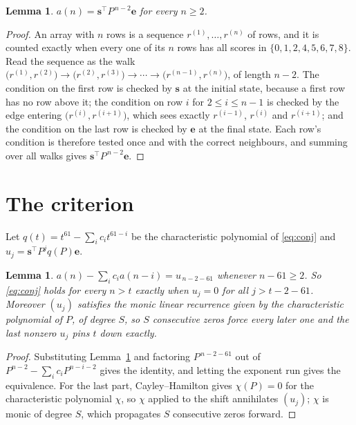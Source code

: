 \documentclass[11pt,a4paper]{article}
\theoremstyle{plain}
\newtheorem{lemma}[theorem]{Lemma}
\theoremstyle{definition}
\begin{document}
\begin{lemma}\label{lem:walk}
$a(n)=\mathbf{s}^{\!\top}P^{\,n-2}\mathbf{e}$ for every $n\ge2$.
\end{lemma}

\begin{proof}
An array with $n$ rows is a sequence $r^{(1)},\dots,r^{(n)}$ of rows, and it is counted
exactly when every one of its $n$ rows has all scores in $\{0,1,2,4,5,6,7,8\}$. Read the sequence as the
walk $\bigl(r^{(1)},r^{(2)}\bigr)\to\bigl(r^{(2)},r^{(3)}\bigr)\to\cdots\to
\bigl(r^{(n-1)},r^{(n)}\bigr)$, of length $n-2$. The condition on the first row is
checked by $\mathbf{s}$ at the initial state, because a first row has no row above it; the
condition on row $i$ for $2\le i\le n-1$ is checked by the edge entering
$\bigl(r^{(i)},r^{(i+1)}\bigr)$, which sees exactly $r^{(i-1)}$, $r^{(i)}$ and
$r^{(i+1)}$; and the condition on the last row is checked by $\mathbf{e}$ at the final
state. Each row's condition is therefore tested once and with the correct neighbours, and
summing over all walks gives $\mathbf{s}^{\!\top}P^{\,n-2}\mathbf{e}$.
\end{proof}

\section{The criterion}

Let $q(t)=t^{61}-\sum_i c_i t^{61-i}$ be the characteristic polynomial of
\eqref{eq:conj} and $u_j=\mathbf{s}^{\!\top}P^{j}q(P)\mathbf{e}$.

\begin{lemma}\label{lem:crit}
$a(n)-\sum_i c_i a(n-i)=u_{\,n-2-61}$ whenever $n-61\ge2$. So \eqref{eq:conj}
holds for every $n>t$ exactly when $u_j=0$ for all $j>t-2-61$. Moreover $(u_j)$
satisfies the monic linear recurrence given by the characteristic polynomial of $P$, of
degree $S$, so $S$ consecutive zeros force every later one and the last nonzero $u_j$ pins
$t$ down exactly.
\end{lemma}

\begin{proof}
Substituting Lemma~\ref{lem:walk} and factoring $P^{\,n-2-61}$ out of
$P^{n-2}-\sum_i c_i P^{n-i-2}$ gives the identity, and letting the exponent run gives the
equivalence. For the last part, Cayley--Hamilton gives $\chi(P)=0$ for the characteristic
polynomial $\chi$, so $\chi$ applied to the shift annihilates $(u_j)$; $\chi$ is monic of
degree $S$, which propagates $S$ consecutive zeros forward.
\end{proof}
\end{document}
